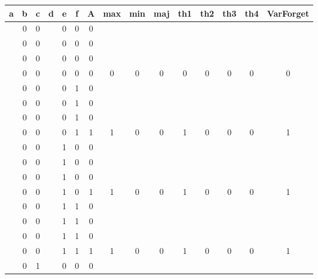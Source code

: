 \begin{table}[!tb]
    \centering
    \begin{tabular}{|c|c|c|c|c|c|c|c|c|c|c|c|c|c|c|}
        \hline
        \textbf{a} & \textbf{b} & \textbf{c} & \textbf{d} & \textbf{e} & \textbf{f} & \textbf{A} & \textbf{max} & \textbf{min} & \textbf{maj} & \textbf{th1} & \textbf{th2} & \textbf{th3} & \textbf{th4} & \textbf{VarForget} \\ \hline
        \rowcolor{gray!40}  & 0 & 0 &  & 0 & 0 & 0 &  &  &  &  &  &  &  &  \\ \hline
        \rowcolor{gray!40}  & 0 & 0 &  & 0 & 0 & 0 &  &  &  &  &  &  &  &  \\ \hline
        \rowcolor{gray!40}  & 0 & 0 &  & 0 & 0 & 0 &  &  &  &  &  &  &  &  \\ \hline
        \rowcolor{gray!40}  & 0 & 0 &  & 0 & 0 & 0 & 0 & 0 & 0 & 0 & 0 & 0 & 0 & 0 \\ \hline
        \rowcolor{blue!40}  & 0 & 0 &  & 0 & 1 & 0 &  &  &  &  &  &  &  &  \\ \hline
        \rowcolor{blue!40}  & 0 & 0 &  & 0 & 1 & 0 &  &  &  &  &  &  &  &  \\ \hline
        \rowcolor{blue!40}  & 0 & 0 &  & 0 & 1 & 0 &  &  &  &  &  &  &  &  \\ \hline
        \rowcolor{blue!40}  & 0 & 0 &  & 0 & 1 & 1 & 1 & 0 & 0 & 1 & 0 & 0 & 0 & 1 \\ \hline
        \rowcolor{red!40}  & 0 & 0 &  & 1 & 0 & 0 &  &  &  &  &  &  &  &  \\ \hline
        \rowcolor{red!40}  & 0 & 0 &  & 1 & 0 & 0 &  &  &  &  &  &  &  &  \\ \hline
        \rowcolor{red!40}  & 0 & 0 &  & 1 & 0 & 0 &  &  &  &  &  &  &  &  \\ \hline
        \rowcolor{red!40}  & 0 & 0 &  & 1 & 0 & 1 & 1 & 0 & 0 & 1 & 0 & 0 & 0 & 1 \\ \hline
        \rowcolor{green!40}  & 0 & 0 &  & 1 & 1 & 0 &  &  &  &  &  &  &  &  \\ \hline
        \rowcolor{green!40}  & 0 & 0 &  & 1 & 1 & 0 &  &  &  &  &  &  &  &  \\ \hline
        \rowcolor{green!40}  & 0 & 0 &  & 1 & 1 & 0 &  &  &  &  &  &  &  &  \\ \hline
        \rowcolor{green!40}  & 0 & 0 &  & 1 & 1 & 1 & 1 & 0 & 0 & 1 & 0 & 0 & 0 & 1 \\ \hline
        \rowcolor{yellow!40}  & 0 & 1 &  & 0 & 0 & 0 &  &  &  &  &  &  &  &  \\ \hline

\end{tabular}
\end{table}
